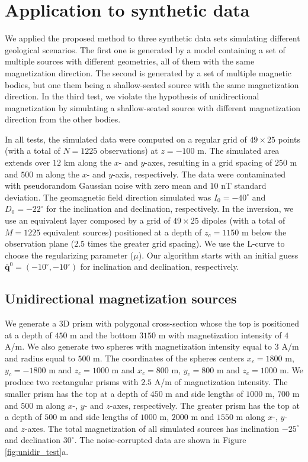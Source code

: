 \section{Application to synthetic data}
\label{sec:synt_tests}

We applied the proposed method to three synthetic data sets simulating different geological scenarios. The first one is generated by a model containing a set of multiple sources with different geometries, all of them with the same magnetization direction. The second is generated by a set of multiple magnetic bodies, but one them being a shallow-seated source with the same magnetization direction. In the third test, we violate the hypothesis of unidirectional magnetization by simulating a shallow-seated source with different magnetization direction from the other bodies.

In all tests, the simulated data were computed on a regular grid of $49 \times 25$ points (with a total of $N = 1225$ observations) at $z = -100$ m.  The simulated 
area extends over $12$ km along the $x$- and $y$-axes, resulting in a grid spacing of $250$ m and $500$ m along the $x$- and $y$-axis, respectively. The data were contaminated with pseudorandom Gaussian noise with zero mean and $10$ nT standard deviation. The geomagnetic field direction simulated was $I_0 = -40^\circ$ and $D_0 = -22^\circ$ for the inclination and declination, respectively. In the inversion, we use an equivalent layer composed by a grid of $49 \times 25$ dipoles (with a total of $M = 1225$ equivalent sources) positioned at a depth of $z_c = 1150$ m below the observation plane ($2.5$ times the greater grid spacing). We use the L-curve to choose the regularizing parameter ($\mu$). Our algorithm starts with an initial guess $\bar{\mathbf{q}}^{0} = (-10^\circ,-10^\circ)$ for inclination and declination, respectively.

\subsection{Unidirectional magnetization sources}
 
We generate a 3D prism with polygonal cross-section whose the top is positioned at a depth of $450$ m and the bottom $3150$ m with magnetization intensity of $4$ A/m. We also generate two spheres with magnetization intensity equal to $3$ A/m and radius equal to $500$ m. The coordinates of the spheres centers $x_c = 1800$ m, $y_c = -1800$ m and $z_c = 1000$ m and $x_c = 800$ m, $y_c = 800$ m and $z_c= 1000$ m. We produce two rectangular prisms with $2.5$ A/m of magnetization intensity. The smaller prism has the top at a depth of $450$ m and side lengths of $1000$ m, $700$ m and $500$ m along $x$-, $y$- and $z$-axes, respectively. The greater prism has the top at a depth of $500$ m and side lengths of $1000$ m, $2000$ m and $1550$ m along $x$-, $y$- and $z$-axes. The total magnetization of 
all simulated sources has inclination $-25^\circ$ and declination $30^\circ$. 
The noise-corrupted data are shown in Figure \ref{fig:unidir_test}a. 

